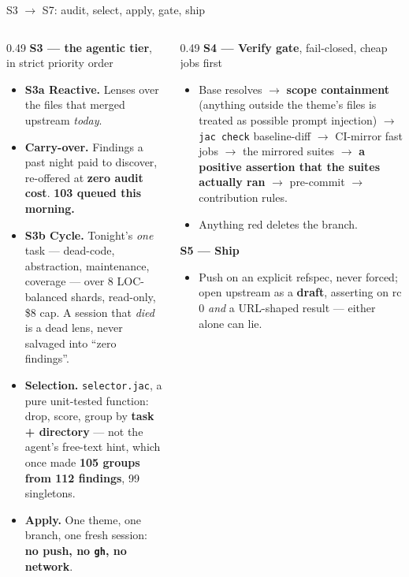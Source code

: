 \documentclass[aspectratio=169,11pt]{beamer}
\newcommand{\good}[1]{\textcolor{jsAccent}{\textbf{#1}}}
\newcommand{\warn}[1]{\textcolor{jsWarm}{\textbf{#1}}}
\begin{document}
\begin{frame}{S3 $\rightarrow$ S7: audit, select, apply, gate, ship}
  \scriptsize
  \begin{columns}[T]
    \begin{column}{0.49\textwidth}
      \textbf{\color{jsPrimary}S3 --- the agentic tier}, in strict priority order
      \begin{itemize}
        \item \textbf{S3a Reactive.} Lenses over the files that merged upstream \emph{today}.
        \item \textbf{Carry-over.} Findings a past night paid to discover, re-offered at \good{zero audit cost}. \textbf{103 queued this morning.}
        \item \textbf{S3b Cycle.} Tonight's \emph{one} task --- dead-code, abstraction, maintenance, coverage --- over 8 LOC-balanced shards, read-only, \$8 cap. A session that \emph{died} is a dead lens, never salvaged into ``zero findings''.
        \item \textbf{Selection.} \texttt{selector.jac}, a pure unit-tested function: drop, score, group by \textbf{task + directory} --- not the agent's free-text hint, which once made \warn{105 groups from 112 findings}, 99 singletons.
        \item \textbf{Apply.} One theme, one branch, one fresh session: \textbf{no push, no \texttt{gh}, no network}.
      \end{itemize}
    \end{column}
    \begin{column}{0.49\textwidth}
      \textbf{\color{jsPrimary}S4 --- Verify gate}, fail-closed, cheap jobs first
      \begin{itemize}
        \item Base resolves $\rightarrow$ \textbf{scope containment} (anything outside the theme's files is treated as possible prompt injection) $\rightarrow$ \texttt{jac check} baseline-diff $\rightarrow$ CI-mirror fast jobs $\rightarrow$ the mirrored suites $\rightarrow$ \good{a positive assertion that the suites actually ran} $\rightarrow$ pre-commit $\rightarrow$ contribution rules.
        \item Anything red deletes the branch.
      \end{itemize}
      \textbf{\color{jsPrimary}S5 --- Ship}
      \begin{itemize}
        \item Push on an explicit refspec, never forced; open upstream as a \textbf{draft}, asserting on rc 0 \emph{and} a URL-shaped result --- either alone can lie.

\end{itemize}
\end{column}
\end{columns}
\end{frame}
\end{document}
